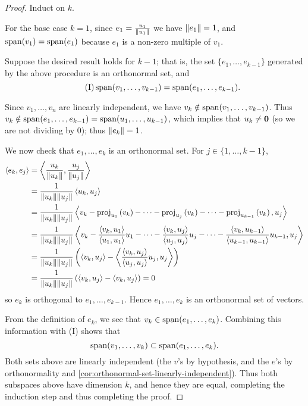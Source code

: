\begin{proof}
Induct on $k$. 

For the base case $k=1$, since $e_1=\frac{u_1}{\norm{u_1}}$ we have $\norm{e_1}=1$, and $\operatorname{span}(v_1)=\operatorname{span}(e_1)$ because $e_1$ is a non-zero multiple of $v_1$.

Suppose the desired result holds for $k-1$; that is, the set $\{e_1,\dots,e_{k-1}\}$ generated by the above procedure is an orthonormal set, and
\begin{equation*}\tag{I}
\operatorname{span}(v_1,\dots,v_{k-1})=\operatorname{span}(e_1,\dots,e_{k-1}).
\end{equation*}

Since $v_1,\dots,v_n$ are linearly independent, we have $v_k\notin\operatorname{span}(v_1,\dots,v_{k-1})$. Thus $v_k\notin\operatorname{span}(e_1,\dots,e_{k-1})=\operatorname{span}(u_1,\dots,u_{k-1})$, which implies that $u_k\neq\vb{0}$ (so we are not dividing by $0$); thus $\norm{e_k}=1$.

We now check that $e_1,\dots,e_k$ is an orthonormal set. For $j\in\{1,\dots,k-1\}$,
\begin{align*}
\left\langle e_k,e_j\right\rangle
&=\left\langle\frac{u_k}{\norm{u_k}},\frac{u_j}{\norm{u_j}}\right\rangle\\
&=\frac{1}{\norm{u_k}\norm{u_j}}\left\langle u_k,u_j\right\rangle\\
&=\frac{1}{\norm{u_k}\norm{u_j}}\left\langle v_k-\mathrm{proj}_{u_1}\left({v_k}\right)-\cdots-\mathrm{proj}_{u_j}\left({v_k}\right)-\cdots-\mathrm{proj}_{u_{k-1}}\left({v_k}\right),u_j\right\rangle\\
&=\frac{1}{\norm{u_k}\norm{u_j}}\left\langle v_k-\frac{\left\langle v_k,u_1\right\rangle}{\left\langle u_1,u_1\right\rangle}u_1-\cdots-\frac{\left\langle v_k,u_j\right\rangle}{\left\langle u_j,u_j\right\rangle}u_j-\cdots-\frac{\left\langle v_k,u_{k-1}\right\rangle}{\left\langle u_{k-1},u_{k-1}\right\rangle}u_{k-1},u_j\right\rangle\\
&=\frac{1}{\norm{u_k}\norm{u_j}}\left(\left\langle v_k,u_j\right\rangle-\left\langle\frac{\left\langle v_k,u_j\right\rangle}{\left\langle u_j,u_j\right\rangle}u_j,u_j\right\rangle\right)\\
&=\frac{1}{\norm{u_k}\norm{u_j}}\left(\left\langle v_k,u_j\right\rangle-\left\langle v_k,u_j\right\rangle\right)=0
\end{align*}
so $e_k$ is orthogonal to $e_1,\dots,e_{k-1}$. 
Hence $e_1,\dots,e_k$ is an orthonormal set of vectors.

From the definition of $e_k$, we see that $v_k\in\operatorname{span}(e_1,\dots,e_k)$. 
Combining this information with (I) shows that
\[\operatorname{span}(v_1,\dots,v_k)\subset\operatorname{span}(e_1,\dots,e_k).\]
Both sets above are linearly independent (the $v$'s by hypothesis, and the $e$'s by orthonormality and \ref{cor:orthonormal-set-linearly-independent}). Thus both subspaces above have dimension $k$, and hence they are equal, completing the induction step and thus completing the proof.
\end{proof}

